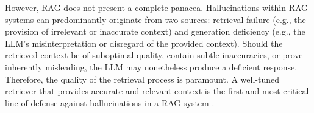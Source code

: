 However, RAG does not present a complete panacea. Hallucinations within RAG systems can predominantly originate from two sources: retrieval failure (e.g., the provision of irrelevant or inaccurate context) and generation deficiency (e.g., the LLM's misinterpretation or disregard of the provided context). Should the retrieved context be of suboptimal quality, contain subtle inaccuracies, or prove inherently misleading, the LLM may nonetheless produce a deficient response. Therefore, the quality of the retrieval process is paramount. A well-tuned retriever that provides accurate and relevant context is the first and most critical line of defense against hallucinations in a RAG system \autocite{gao2024retrievalaugmented}.